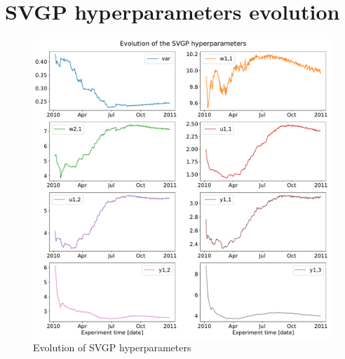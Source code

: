 \section{SVGP hyperparameters evolution}\label{anx:hyperparams_evol}

\begin{figure}[ht]
    \centering
    \includegraphics[width =
    \textwidth]{Plots/1_SVGP_480pts_inf_window_12_averageYear_evol_hyperparameters.pdf}
    \caption{Evolution of SVGP hyperparameters}
    \label{fig:SVGP_evol_hyperparameters}
\end{figure}

